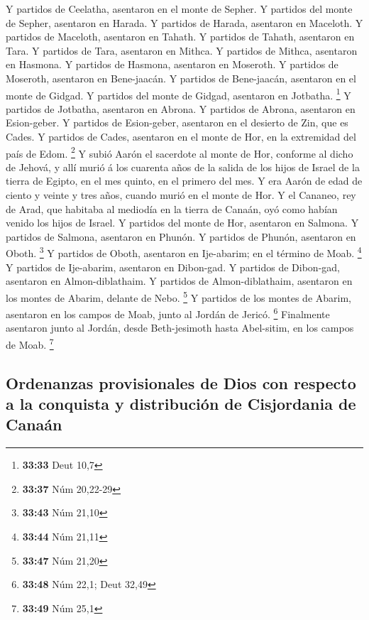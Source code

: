  Y partidos de Ceelatha, asentaron en el monte de Sepher.
 Y partidos del monte de Sepher, asentaron en Harada.
 Y partidos de Harada, asentaron en Maceloth.
 Y partidos de Maceloth, asentaron en Tahath.
 Y partidos de Tahath, asentaron en Tara. 
Y partidos de Tara, asentaron en Mithca.  Y partidos de
Mithca, asentaron en Hasmona.  Y partidos de Hasmona,
asentaron en Moseroth.  Y partidos de Moseroth, asentaron
en Bene-jaacán.  Y partidos de Bene-jaacán, asentaron en
el monte de Gidgad.  Y partidos del monte de Gidgad,
asentaron en Jotbatha. \footnote{\textbf{33:33} Deut 10,7}
 Y partidos de Jotbatha, asentaron en Abrona.
 Y partidos de Abrona, asentaron en Esion-geber.
 Y partidos de Esion-geber, asentaron en el desierto de
Zin, que es Cades.  Y partidos de Cades, asentaron en el
monte de Hor, en la extremidad del país de Edom. \footnote{\textbf{33:37}
  Núm 20,22-29}  Y subió Aarón el sacerdote al monte de
Hor, conforme al dicho de Jehová, y allí murió á los cuarenta años de la
salida de los hijos de Israel de la tierra de Egipto, en el mes quinto,
en el primero del mes.  Y era Aarón de edad de ciento y
veinte y tres años, cuando murió en el monte de Hor.  Y
el Cananeo, rey de Arad, que habitaba al mediodía en la tierra de
Canaán, oyó como habían venido los hijos de Israel.  Y
partidos del monte de Hor, asentaron en Salmona.  Y
partidos de Salmona, asentaron en Phunón.  Y partidos de
Phunón, asentaron en Oboth. \footnote{\textbf{33:43} Núm 21,10}
 Y partidos de Oboth, asentaron en Ije-abarim; en el
término de Moab. \footnote{\textbf{33:44} Núm 21,11}  Y
partidos de Ije-abarim, asentaron en Dibon-gad.  Y
partidos de Dibon-gad, asentaron en Almon-diblathaim.  Y
partidos de Almon-diblathaim, asentaron en los montes de Abarim, delante
de Nebo. \footnote{\textbf{33:47} Núm 21,20}  Y partidos
de los montes de Abarim, asentaron en los campos de Moab, junto al
Jordán de Jericó. \footnote{\textbf{33:48} Núm 22,1; Deut 32,49}
 Finalmente asentaron junto al Jordán, desde
Beth-jesimoth hasta Abel-sitim, en los campos de Moab. \footnote{\textbf{33:49}
  Núm 25,1}

\hypertarget{ordenanzas-provisionales-de-dios-con-respecto-a-la-conquista-y-distribuciuxf3n-de-cisjordania-de-canauxe1n}{%
\subsection{Ordenanzas provisionales de Dios con respecto a la conquista
y distribución de Cisjordania de
Canaán}\label{ordenanzas-provisionales-de-dios-con-respecto-a-la-conquista-y-distribuciuxf3n-de-cisjordania-de-canauxe1n}}

